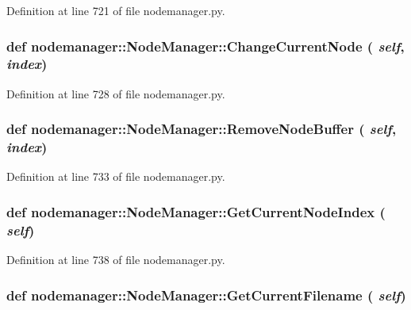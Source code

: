 Definition at line 721 of file nodemanager.py.\hypertarget{classnodemanager_1_1NodeManager_4ac7001e425a05c907a28218075f175f}{
\subsubsection[ChangeCurrentNode]{\setlength{\rightskip}{0pt plus 5cm}def nodemanager::Node\-Manager::Change\-Current\-Node ( {\em self},  {\em index})}}
\label{classnodemanager_1_1NodeManager_4ac7001e425a05c907a28218075f175f}




Definition at line 728 of file nodemanager.py.\hypertarget{classnodemanager_1_1NodeManager_3ccf1080dcb1e1efc94e5311fcfbf60b}{
\subsubsection[RemoveNodeBuffer]{\setlength{\rightskip}{0pt plus 5cm}def nodemanager::Node\-Manager::Remove\-Node\-Buffer ( {\em self},  {\em index})}}
\label{classnodemanager_1_1NodeManager_3ccf1080dcb1e1efc94e5311fcfbf60b}




Definition at line 733 of file nodemanager.py.\hypertarget{classnodemanager_1_1NodeManager_ec0793f016391c954ceb4654e4130dc3}{
\subsubsection[GetCurrentNodeIndex]{\setlength{\rightskip}{0pt plus 5cm}def nodemanager::Node\-Manager::Get\-Current\-Node\-Index ( {\em self})}}
\label{classnodemanager_1_1NodeManager_ec0793f016391c954ceb4654e4130dc3}




Definition at line 738 of file nodemanager.py.\hypertarget{classnodemanager_1_1NodeManager_1dedfc92859eb980e74ea6544233e6ba}{
\subsubsection[GetCurrentFilename]{\setlength{\rightskip}{0pt plus 5cm}def nodemanager::Node\-Manager::Get\-Current\-Filename ( {\em self})}}
\label{classnodemanager_1_1NodeManager_1dedfc92859eb980e74ea6544233e6ba}




